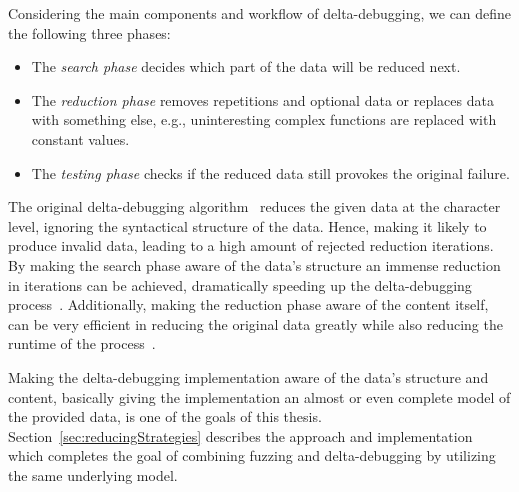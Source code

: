 Considering the main components and workflow of delta-debugging, we can define the following three phases:

\begin{itemize}
\item The \emph{search phase} decides which part of the data will be reduced next.
\item The \emph{reduction phase} removes repetitions and optional data or replaces data with something else, e.g., uninteresting complex functions are replaced with constant values.
\item The \emph{testing phase} checks if the reduced data still provokes the original failure.
\end{itemize}

The original delta-debugging algorithm~\cite{zeller2009programs} reduces the given data at the character level, ignoring the syntactical structure of the data. Hence, making it likely to produce invalid data, leading to a high amount of rejected reduction iterations. By making the search phase aware of the data's structure an immense reduction in iterations can be achieved, dramatically speeding up the delta-debugging process~\cite{misherghi2006hdd, brummayer2009fuzzing, brummayer2010automated}. Additionally, making the reduction phase aware of the content itself, can be very efficient in reducing the original data greatly while also reducing the runtime of the process~\cite{brummayer2009fuzzing, brummayer2010automated}.

Making the delta-debugging implementation aware of the data's structure and content, basically giving the implementation an almost or even complete model of the provided data, is one of the goals of this thesis. Section~\ref{sec:reducingStrategies} describes the approach and implementation which completes the goal of combining fuzzing and delta-debugging by utilizing the same underlying model.
